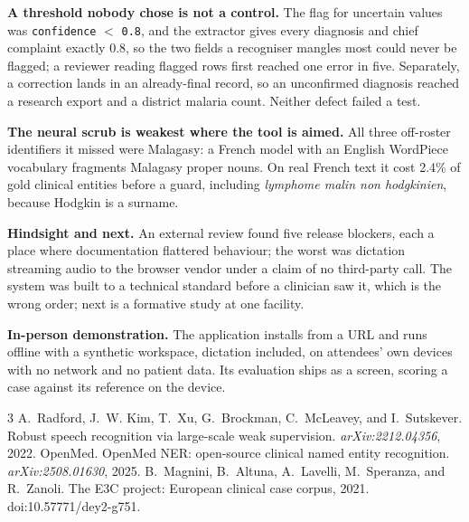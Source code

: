 \textbf{A threshold nobody chose is not a control.} The flag for uncertain
values was \texttt{confidence} $<$ \texttt{0.8}, and the extractor gives every
diagnosis and chief complaint exactly 0.8, so the two fields a recogniser
mangles most could never be flagged; a reviewer reading flagged rows first
reached one error in five. Separately, a correction lands in an already-final
record, so an unconfirmed diagnosis reached a research export and a district
malaria count. Neither defect failed a test.

\textbf{The neural scrub is weakest where the tool is aimed.} All three off-roster identifiers it missed were Malagasy: a French model with an
English WordPiece vocabulary fragments Malagasy proper nouns. On real French
text it cost 2.4\% of gold clinical entities before a guard, including
\emph{lymphome malin non hodgkinien}, because Hodgkin is a surname.

\textbf{Hindsight and next.} An external review found five release blockers,
each a place where documentation flattered behaviour; the worst was dictation
streaming audio to the browser vendor under a claim of no third-party call. The
system was built to a technical standard before a clinician saw it, which is
the wrong order; next is a formative study at one facility.

\textbf{In-person demonstration.} The application installs from a URL and runs
offline with a synthetic workspace, dictation included, on attendees' own
devices with no network and no patient data. Its evaluation ships as a screen,
scoring a case against its reference on the device.

\footnotesize
\begin{thebibliography}{3}
\itemsep0pt \parskip0pt
 A.~Radford, J.~W. Kim,
T.~Xu, G.~Brockman, C.~McLeavey, and I.~Sutskever. Robust speech recognition
via large-scale weak supervision. \emph{arXiv:2212.04356}, 2022.
 OpenMed. {OpenMed} {NER}: open-source
clinical named entity recognition. \emph{arXiv:2508.01630}, 2025.
 B.~Magnini, B.~Altuna,
A.~Lavelli, M.~Speranza, and R.~Zanoli. The {E3C} project: European clinical
case corpus, 2021. doi:10.57771/dey2-g751.
\end{thebibliography}
